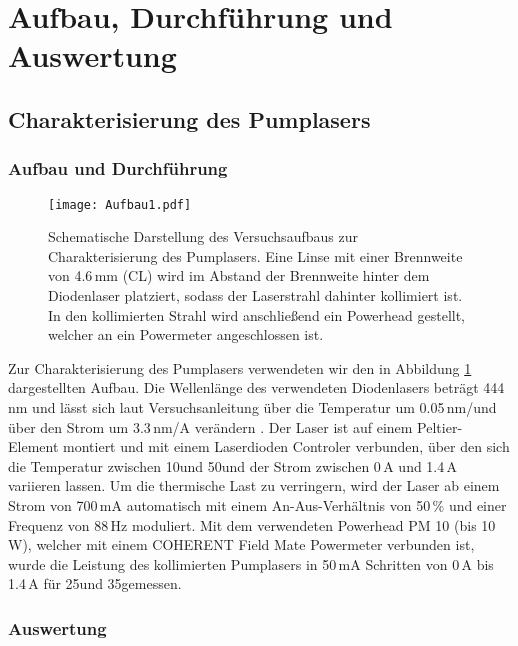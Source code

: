 \section{Aufbau, Durchführung und Auswertung}

\subsection{Charakterisierung des Pumplasers}


\subsubsection{Aufbau und Durchführung}

\begin{figure}[H]
\begin{center}
  \texttt{[image: Aufbau1.pdf]}
  \caption{Schematische Darstellung des Versuchsaufbaus zur Charakterisierung des Pumplasers. Eine
  Linse mit einer Brennweite von 4.6\,mm (CL) wird im Abstand der Brennweite hinter dem Diodenlaser
  platziert, sodass der Laserstrahl dahinter kollimiert ist. In den kollimierten Strahl wird
  anschließend ein Powerhead gestellt, welcher an ein Powermeter angeschlossen ist.}
  \label{img:aufbau1}
\end{center}
\end{figure}

Zur Charakterisierung des Pumplasers verwendeten wir den in Abbildung \ref{img:aufbau1}
dargestellten Aufbau. Die Wellenlänge des verwendeten Diodenlasers beträgt 444\,nm und lässt sich
laut Versuchsanleitung über die Temperatur um 0.05\,nm/\grad und über den Strom um 3.3\,nm/A
verändern \cite{Versuchsanleitung}. Der Laser ist auf einem Peltier-Element montiert und mit einem
Laserdioden Controler verbunden, über den sich die Temperatur zwischen 10\grad und 50\grad und der Strom zwischen 0\,A und
1.4\,A variieren lassen. Um die thermische Last zu verringern, wird der Laser ab einem Strom von
700\,mA automatisch mit einem An-Aus-Verhältnis von 50\,\% und einer Frequenz von 88\,Hz moduliert.
Mit dem verwendeten Powerhead PM 10 (bis 10\,W), welcher mit einem COHERENT Field Mate Powermeter
verbunden ist, wurde die Leistung des kollimierten Pumplasers in 50\,mA Schritten von 0\,A bis
1.4\,A für 25\grad und 35\grad gemessen.


\subsubsection{Auswertung}

